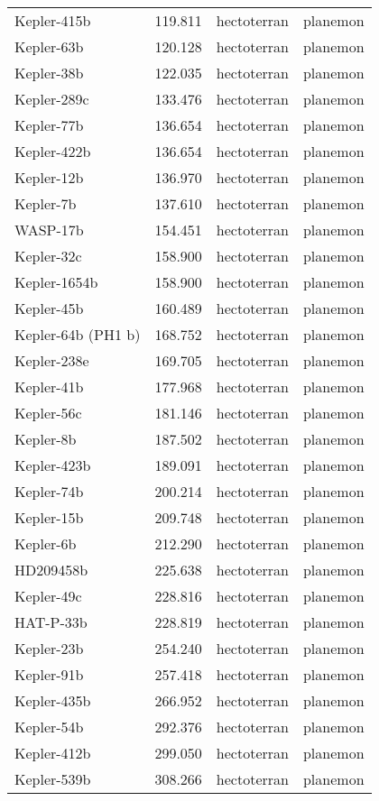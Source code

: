 \documentclass[
  letterpaper,
]{book}
\begin{document}
\begin{longtable}[]{@{}llll@{}}
Kepler-415b & 119.811 & hectoterran & planemon \\
Kepler-63b & 120.128 & hectoterran & planemon \\
Kepler-38b & 122.035 & hectoterran & planemon \\
Kepler-289c & 133.476 & hectoterran & planemon \\
Kepler-77b & 136.654 & hectoterran & planemon \\
Kepler-422b & 136.654 & hectoterran & planemon \\
Kepler-12b & 136.970 & hectoterran & planemon \\
Kepler-7b & 137.610 & hectoterran & planemon \\
WASP-17b & 154.451 & hectoterran & planemon \\
Kepler-32c & 158.900 & hectoterran & planemon \\
Kepler-1654b & 158.900 & hectoterran & planemon \\
Kepler-45b & 160.489 & hectoterran & planemon \\
Kepler-64b (PH1 b) & 168.752 & hectoterran & planemon \\
Kepler-238e & 169.705 & hectoterran & planemon \\
Kepler-41b & 177.968 & hectoterran & planemon \\
Kepler-56c & 181.146 & hectoterran & planemon \\
Kepler-8b & 187.502 & hectoterran & planemon \\
Kepler-423b & 189.091 & hectoterran & planemon \\
Kepler-74b & 200.214 & hectoterran & planemon \\
Kepler-15b & 209.748 & hectoterran & planemon \\
Kepler-6b & 212.290 & hectoterran & planemon \\
HD209458b & 225.638 & hectoterran & planemon \\
Kepler-49c & 228.816 & hectoterran & planemon \\
HAT-P-33b & 228.819 & hectoterran & planemon \\
Kepler-23b & 254.240 & hectoterran & planemon \\
Kepler-91b & 257.418 & hectoterran & planemon \\
Kepler-435b & 266.952 & hectoterran & planemon \\
Kepler-54b & 292.376 & hectoterran & planemon \\
Kepler-412b & 299.050 & hectoterran & planemon \\
Kepler-539b & 308.266 & hectoterran & planemon \\

\end{longtable}
\end{document}
